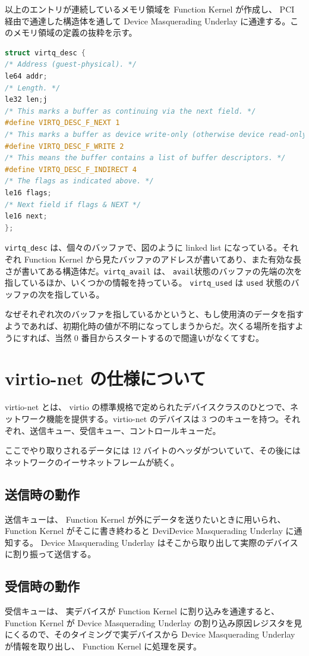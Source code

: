 \documentclass[a4paper,11pt,report]{ltjsbook}
\begin{document}
以上のエントリが連続しているメモリ領域を Function Kernel が作成し、 PCI 経由で通達した構造体を通して Device Masquerading Underlay に通達する。このメモリ領域の定義の抜粋を示す。

\begin{lstlisting}[language=C]
struct virtq_desc {
/* Address (guest-physical). */
le64 addr;
/* Length. */
le32 len;j
/* This marks a buffer as continuing via the next field. */
#define VIRTQ_DESC_F_NEXT 1
/* This marks a buffer as device write-only (otherwise device read-only). */
#define VIRTQ_DESC_F_WRITE 2
/* This means the buffer contains a list of buffer descriptors. */
#define VIRTQ_DESC_F_INDIRECT 4
/* The flags as indicated above. */
le16 flags;
/* Next field if flags & NEXT */
le16 next;
};
\end{lstlisting}

\texttt{virtq\_desc} は、個々のバッファで、図のように linked list になっている。それぞれ Function Kernel から見たバッファのアドレスが書いてあり、また有効な長さが書いてある構造体だ。\texttt{virtq\_avail} は、 \texttt{avail}状態のバッファの先端の次を指しているほか、いくつかの情報を持っている。 \texttt{virtq\_used} は \texttt{used} 状態のバッファの次を指している。

なぜそれぞれ次のバッファを指しているかというと、もし使用済のデータを指すようであれば、初期化時の値が不明になってしまうからだ。次くる場所を指すようにすれば、当然 0 番目からスタートするので間違いがなくてすむ。

\section{virtio-net の仕様について}

virtio-net とは、 virtio の標準規格\cite{virtio_spec}で定められたデバイスクラスのひとつで、ネットワーク機能を提供する。virtio-net のデバイスは 3 つのキューを持つ。それぞれ、送信キュー、受信キュー、コントロールキューだ。

ここでやり取りされるデータには 12 バイトのヘッダがついていて、その後にはネットワークのイーサネットフレームが続く。

\subsection{送信時の動作}
送信キューは、 Function Kernel が外にデータを送りたいときに用いられ、 Function Kernel がそこに書き終わると DeviDevice Masquerading Underlay に通知する。 Device Masquerading Underlay はそこから取り出して実際のデバイスに割り振って送信する。
\subsection{受信時の動作}
受信キューは、 実デバイスが Function Kernel に割り込みを通達すると、 Function Kernel が Device Masquerading Underlay の割り込み原因レジスタを見にくるので、そのタイミングで実デバイスから Device Masquerading Underlay が情報を取り出し、 Function Kernel に処理を戻す。
\end{document}
